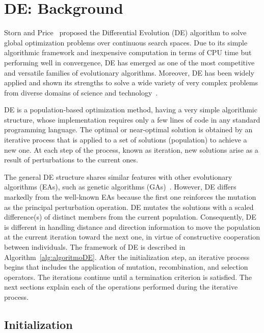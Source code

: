 \section{DE: Background}
\label{sec:DE}
\vspace{-0.4cm}
Storn and Price~\cite{Storn1997,storn95} proposed the Differential Evolution (DE) algorithm to solve global optimization problems over continuous search spaces. Due to its simple algorithmic framework and inexpensive computation in terms of CPU time but performing well in convergence, DE has emerged as one of the most competitive and versatile families of evolutionary algorithms. Moreover, DE has been widely applied and shown its strengths to solve a wide variety of very complex problems from diverse domains of science and technology~\cite{DAS2016,Price:2005}.  

DE is a population-based optimization method, having a very simple algorithmic structure, whose implementation requires only a few lines of code in any standard programming language. The optimal or near-optimal solution is obtained by an iterative process that is applied to a set of solutions (population) to achieve a new one. At each step of the process, known as iteration, new solutions arise as a result of perturbations to the current ones. 

The general DE structure shares similar features with other evolutionary algorithms (EAs), such as genetic algorithms (GAs)~\cite{holland75}. However, DE differs markedly from the well-known EAs because the first one reinforces the mutation as the principal perturbation operation. DE mutates the solutions with a scaled difference(s) of distinct members from the current population. Consequently, DE is different in handling distance and direction information to move the population at the current iteration toward the next one, in virtue of constructive cooperation between individuals.
The framework of DE is described in Algorithm~\ref{alg:algoritmoDE}. After the initialization step, an iterative process begins that includes the application of mutation, recombination, and selection operators. The iterations continue until a termination criterion is satisfied. The next sections explain each of the operations performed during the iterative process.

\subsection{Initialization}

